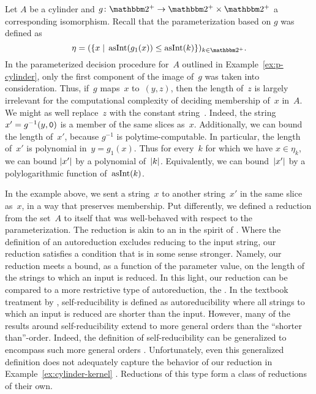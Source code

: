 \begin{example}
\label{ex:cylinder-kernel}%
  Let $A$ be a \pdash{}cylinder and $g\colon \binary^+ \to \binary^+ \times \binary^+$ a corresponding isomorphism.
  Recall that the parameterization based on $g$ was defined as
  \begin{equation*}
    \eta \deq (\{x \st \asNat(g_1(x)) \le \asNat(k)\})_{k \in \binary^+}.
  \end{equation*}
  In the parameterized decision procedure for~$A$ outlined in Example~\ref{ex:p-cylinder}, only the first component of the image of~$g$ was taken into consideration.
  Thus, if~$g$ maps~$x$ to~$(y, z)$, then the length of~$z$ is largely irrelevant for the computational complexity of deciding membership of~$x$ in~$A$.
  We might as well replace~$z$ with the constant string~.
  Indeed, the string $x' = g^{-1}(y, \textnormal{\texttt{0}})$ is a member of the same slices as~$x$.
  Additionally, we can bound the length of~$x'$, because $g^{-1}$ is polytime-computable.
  In particular, the length of~$x'$ is polynomial in~$y = g_1(x)$.
  Thus for every~$k$ for which we have $x \in \eta_k$, we can bound ${\lvert x'\rvert}$ by a polynomial of~${\lvert k\rvert}$.
  Equivalently, we can bound~${\lvert x'\rvert}$ by a polylogarithmic function of~$\operatorname{asInt}(k)$.
\end{example}

In the example above, we sent a string~$x$ to another string~$x'$ in the same slice as~$x$, in a way that preserves membership.
Put differently, we defined a reduction from the set~$A$ to itself that was well-behaved with respect to the parameterization.
The reduction is akin to an  in the spirit of \textcite{trakhtenbrot1970autoreducibility}.
Where the definition of an autoreduction excludes reducing to the input string, our reduction satisfies a condition that is in some sense stronger.
Namely, our reduction meets a bound, as a function of the parameter value, on the length of the strings to which an input is reduced.
In this light, our reduction can be compared to a more restrictive type of autoreduction, the  \parencite{meyer1979with}.
In the textbook treatment by \textcite[][Section~4.5]{balcazar1995structural}, self-reducibility is defined as autoreducibility where all strings to which an input is reduced are shorter than the input.
However, many of the results around self-reducibility extend to more general orders than the \enquote{shorter than}-order.
Indeed, the definition of self-reducibility can be generalized to encompass such more general orders \parencite{ko1983self,orponen1986optimal,buhrman1996p-selective}.
Unfortunately, even this generalized definition does not adequately capture the behavior of our reduction in Example~\ref{ex:cylinder-kernel} \parencite{chen2011lower}.
Reductions of this type form a class of reductions of their own.

